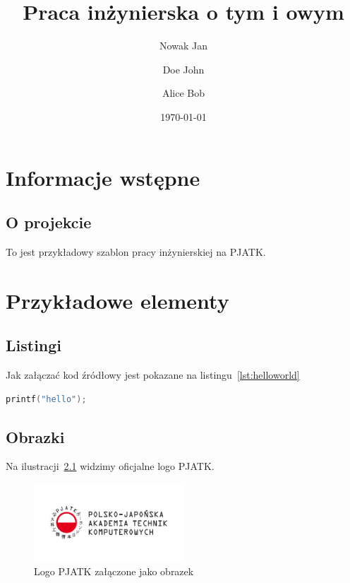 \documentclass{sprz}
\title{Praca inżynierska o tym i owym}
\author{Nowak Jan}{s1234}
\author{Doe John}{s1222}
\author{Alice Bob}{s1299}
\date{\today}
\begin{document}
\maketitle

\tableofcontents

\chapter{Informacje wstępne}



\section{O projekcie}\label{ch:wstep}

To jest przykładowy szablon pracy inżynierskiej na PJATK.

\chapter{Przykładowe elementy}

\section{Listingi}

Jak załączać kod źródłowy jest pokazane na listingu~\ref{lst:helloworld}


\begin{lstlisting}[language=c,caption={Przykładowy witaj w świecie}, label={lst:helloworld}]
printf("hello");
\end{lstlisting}

\section{Obrazki}

Na ilustracji~\ref{img:pjatklogo} widzimy oficjalne logo PJATK.

\begin{figure}[h]
    \centering
    \includegraphics[width=0.5\textwidth]{sprz/pjatk}
    \caption{Logo PJATK załączone jako obrazek}
    \label{img:pjatklogo}
\end{figure}
\end{document}

